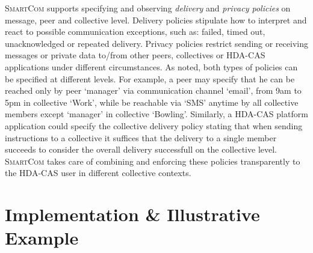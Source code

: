 \documentclass{llncs}
\newcommand{\mdl}{\textsc{SmartCom}}
\begin{document}
    \mdl{} supports specifying and observing \textit{delivery} and \textit{privacy policies} on message, peer and collective level. 
	Delivery policies stipulate how to interpret and react to possible communication exceptions, such as: failed, timed out, unacknowledged or repeated  delivery. Privacy policies restrict sending or receiving messages or private data to/from other peers, collectives or HDA-CAS applications under different circumstances. As noted, both types of policies can be specified at different levels. For example, a peer may specify that he can be reached only by peer `manager' via communication channel `email', from 9am to 5pm in collective `Work', while be reachable via `SMS' anytime by all collective members except `manager' in collective `Bowling'.
	Similarly, a HDA-CAS platform application could specify the collective delivery policy stating that when sending instructions to a collective it suffices that the delivery to a single member succeeds to consider the overall delivery successfull on the collective level. \mdl{} takes care of combining and enforcing these policies transparently to the HDA-CAS user in different collective contexts.

 
      
\section{Implementation \& Illustrative Example}
\label{sec:impl}
\end{document}
